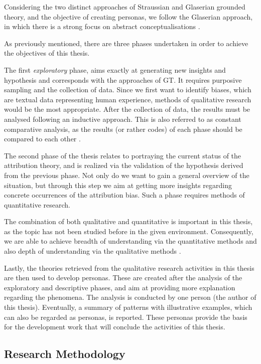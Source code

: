 Considering the two distinct approaches of Straussian and Glaserian grounded theory, and the objective of creating personas, we follow the Glaserian approach, in which there is a strong focus on abstract conceptualisations \cite{Fernandez2004}.

As previously mentioned, there are three phases undertaken in order to achieve the objectives of this thesis.

The first \textit{exploratory} phase, aims exactly at generating new insights and hypothesis and corresponds with the approaches of GT. It requires purposive sampling and the collection of data. Since we first want to identify biases, which are textual data representing human experience, methods of qualitative research would be the most appropriate. After the collection of data, the results must be analysed following an inductive approach. This is also referred to as constant comparative analysis, as the results (or rather codes) of each phase should be compared to each other \cite{Chun2019}. 

The second phase of the thesis relates to portraying the current status of the attribution theory, and is realized via the validation of the hypothesis derived from the previous phase. Not only do we want to gain a general overview of the situation, but through this step we aim at getting more insights regarding concrete occurrences of the attribution bias. Such a phase requires methods of quantitative research. 

The combination of both qualitative and quantitative is important in this thesis, as the topic has not been studied before in the given environment. Consequently, we are able to achieve breadth of understanding via the quantitative methods and also depth of understanding via the qualitative methods \cite{Patton2002}.

Lastly, the theories retrieved from the qualitative research activities in this thesis are then used to develop personas. These are created after the analysis of the exploratory and descriptive phases, and aim at providing more explanation regarding the phenomena. The analysis is conducted by one person (the author of this thesis). Eventually, a summary of patterns with illustrative examples, which can also be regarded as personas, is reported. These personas provide the basis for the development work that will conclude the activities of this thesis. 

\subsection{Research Methodology} \label{ResearchMethodology}

